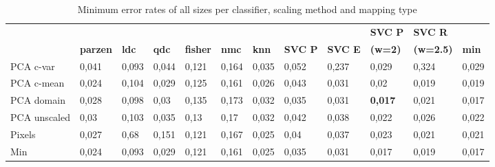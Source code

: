 \documentclass{article}
\begin{document}
\begin{table}[H]
  \small
  \centering
    \begin{tabular}{l|llllllllll|l}
    \hline
     & & & & & & & &  & \textbf{SVC P} & \textbf{SVC R} &  \\
          & \multicolumn{1}{l}{\textbf{parzen}} & \multicolumn{1}{l}{\textbf{ldc}} & \multicolumn{1}{l}{\textbf{qdc}} & \multicolumn{1}{l}{\textbf{fisher}} & \multicolumn{1}{l}{\textbf{nmc}} & \multicolumn{1}{l}{\textbf{knn}} & \multicolumn{1}{l}{\textbf{SVC P}} & \multicolumn{1}{l}{\textbf{SVC E}} & \textbf{(w=2)} & \textbf{(w=2.5)} & \multicolumn{1}{l}{\textbf{min}} \\ \hline
    PCA c-var & \multicolumn{1}{l}{0,041} & \multicolumn{1}{l}{0,093} & \multicolumn{1}{l}{0,044} & \multicolumn{1}{l}{0,121} & \multicolumn{1}{l}{0,164} & \multicolumn{1}{l}{0,035} & \multicolumn{1}{l}{0,052} & \multicolumn{1}{l}{0,237} & 0,029 & 0,324 & \multicolumn{1}{l}{0,029} \\
    PCA c-mean & \multicolumn{1}{l}{0,024} & \multicolumn{1}{l}{0,104} & \multicolumn{1}{l}{0,029} & \multicolumn{1}{l}{0,125} & \multicolumn{1}{l}{0,161} & \multicolumn{1}{l}{0,026} & \multicolumn{1}{l}{0,043} & \multicolumn{1}{l}{0,031} & 0,02  & 0,019 & \multicolumn{1}{l}{0,019} \\
    PCA domain & \multicolumn{1}{l}{0,028} & \multicolumn{1}{l}{0,098} & \multicolumn{1}{l}{0,03} & \multicolumn{1}{l}{0,135} & \multicolumn{1}{l}{0,173} & \multicolumn{1}{l}{0,032} & \multicolumn{1}{l}{0,035} & \multicolumn{1}{l}{0,031} & \textbf{0,017} & 0,021 & \multicolumn{1}{l}{0,017} \\
    PCA unscaled & \multicolumn{1}{l}{0,03} & \multicolumn{1}{l}{0,103} & \multicolumn{1}{l}{0,035} & \multicolumn{1}{l}{0,13} & \multicolumn{1}{l}{0,17} & \multicolumn{1}{l}{0,032} & \multicolumn{1}{l}{0,042} & \multicolumn{1}{l}{0,038} & 0,022 & 0,026 & \multicolumn{1}{l}{0,022} \\
    Pixels & \multicolumn{1}{l}{0,027} & \multicolumn{1}{l}{0,68} & \multicolumn{1}{l}{0,151} & \multicolumn{1}{l}{0,121} & \multicolumn{1}{l}{0,167} & \multicolumn{1}{l}{0,025} & \multicolumn{1}{l}{0,04} & \multicolumn{1}{l}{0,037} & 0,023 & 0,021 & \multicolumn{1}{l}{0,021} \\ \hline
    Min   & \multicolumn{1}{l}{0,024} & \multicolumn{1}{l}{0,093} & \multicolumn{1}{l}{0,029} & \multicolumn{1}{l}{0,121} & \multicolumn{1}{l}{0,161} & \multicolumn{1}{l}{0,025} & \multicolumn{1}{l}{0,035} & \multicolumn{1}{l}{0,031} & 0,017 & 0,019 & \multicolumn{1}{l}{0,017} \\
    \hline
    \end{tabular}%

  \caption{Minimum error rates of all sizes per classifier, scaling method and mapping type} \label{table: error rate summary PCA2}   
\end{table}%
\end{document}
